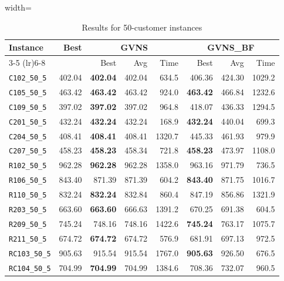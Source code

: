 \begin{table}[ht]
\centering
\small
\setlength{\tabcolsep}{5pt}
\caption{Results for 50-customer instances}
\vspace{4mm}
\begin{adjustbox}{width=\textwidth}
\begin{tabular}{l r r r r @{\hspace{8pt}} r r r @{\hspace{8pt}}}
\toprule
\multirow{2}{*}{Instance} & \multirow{2}{*}{Best} & \multicolumn{3}{c}{GVNS} & \multicolumn{3}{c}{GVNS\_BF} \\
\cmidrule(lr){3-5} \cmidrule(lr){6-8}
 &  & Best & Avg & Time & Best & Avg & Time \\
\midrule
\texttt{C102\_50\_5} & 402.04 & \textbf{402.04} & 402.04 & 634.5 & 406.36 & 424.30 & 1029.2 \\
\texttt{C105\_50\_5} & 463.42 & \textbf{463.42} & 463.42 & 924.0 & \textbf{463.42} & 466.84 & 1232.6 \\
\texttt{C109\_50\_5} & 397.02 & \textbf{397.02} & 397.02 & 964.8 & 418.07 & 436.33 & 1294.5 \\
\texttt{C201\_50\_5} & 432.24 & \textbf{432.24} & 432.24 & 168.9 & \textbf{432.24} & 440.04 & 699.3 \\
\texttt{C204\_50\_5} & 408.41 & \textbf{408.41} & 408.41 & 1320.7 & 445.33 & 461.93 & 979.9 \\
\texttt{C207\_50\_5} & 458.23 & \textbf{458.23} & 458.34 & 721.8 & \textbf{458.23} & 473.97 & 1108.0 \\
\texttt{R102\_50\_5} & 962.28 & \textbf{962.28} & 962.28 & 1358.0 & 963.16 & 971.79 & 736.5 \\
\texttt{R106\_50\_5} & 843.40 & 871.39 & 871.39 & 604.2 & \textbf{843.40} & 871.75 & 1016.7 \\
\texttt{R110\_50\_5} & 832.24 & \textbf{832.24} & 832.84 & 860.4 & 847.19 & 856.86 & 1321.9 \\
\texttt{R203\_50\_5} & 663.60 & \textbf{663.60} & 666.63 & 1391.2 & 670.25 & 691.38 & 604.5 \\
\texttt{R209\_50\_5} & 745.24 & 748.16 & 748.16 & 1422.6 & \textbf{745.24} & 763.17 & 1075.7 \\
\texttt{R211\_50\_5} & 674.72 & \textbf{674.72} & 674.72 & 576.9 & 681.91 & 697.13 & 972.5 \\
\texttt{RC103\_50\_5} & 905.63 & 915.54 & 915.54 & 1767.0 & \textbf{905.63} & 926.50 & 676.5 \\
\texttt{RC104\_50\_5} & 704.99 & \textbf{704.99} & 704.99 & 1384.6 & 708.36 & 732.07 & 960.5 \\

\end{tabular}
\end{adjustbox}
\end{table}
